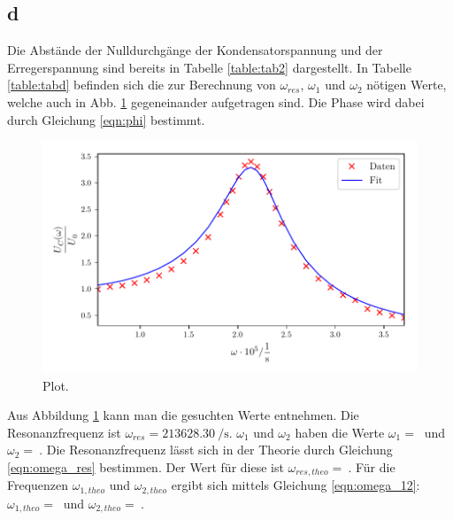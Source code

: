 \subsection{d}
Die Abstände der Nulldurchgänge der Kondensatorspannung und
der Erregerspannung sind bereits in Tabelle \ref{table:tab2}
dargestellt. In Tabelle \ref{table:tabd} befinden sich die
zur Berechnung von $\omega_{res}$, $\omega_{1}$ und $\omega_{2}$
nötigen Werte, welche auch in Abb. \ref{fig:plotd} gegeneinander
aufgetragen sind. Die Phase wird dabei durch Gleichung \eqref{eqn:phi}
bestimmt.

\begin{figure}
  \centering
  \includegraphics{build/plotc.pdf}
  \caption{Plot.}
  \label{fig:plotd}
\end{figure}
\noindent Aus Abbildung \ref{fig:plotd} kann man die gesuchten Werte entnehmen. %
Die Resonanzfrequenz ist $\omega_{res} = \SI[per-mode=fraction]{213628.30}{\per\second}$.
$\omega_{1}$ und $\omega_{2}$ haben die Werte
$\omega_{1} = \SI{}{}$ und
$\omega_{2} = \SI{}{}$.
\newline
Die Resonanzfrequenz lässt sich in der Theorie durch 
Gleichung \eqref{eqn:omega_res} bestimmen.
Der Wert für diese ist $\omega_{res,theo} = \SI{}{}$.
Für die Frequenzen $\omega_{1,theo}$ und $\omega_{2,theo}$ ergibt sich
mittels Gleichung \eqref{eqn:omega_12}:
$\omega_{1,theo} = \SI{}{}$ und $\omega_{2,theo} = \SI{}{}$.